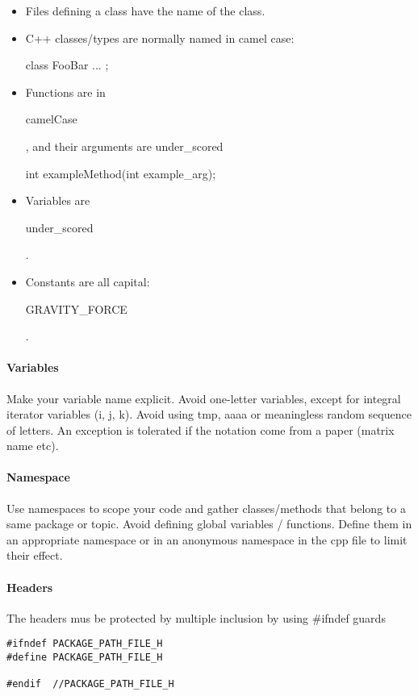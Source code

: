 \begin{itemize}
\item Files defining a class have the name of the class.
\item C++ classes/types are normally named in camel case:\\
\begin{tt}
class FooBar { ... };
\end{tt}
\item Functions are in \begin{tt}camelCase\end{tt}, and their arguments are under\_scored\\
\begin{tt}
int exampleMethod(int example\_arg);
\end{tt}

\item Variables are \begin{tt}under\_scored\end{tt}.

\item Constants are all capital: \begin{tt}GRAVITY\_FORCE\end{tt}.
\end{itemize}

\paragraph{Variables}
Make your variable name explicit.
Avoid one-letter variables, except for integral iterator variables (i, j, k).
Avoid using tmp, aaaa or meaningless random sequence of letters.
An exception is tolerated if the notation come from a paper (matrix name etc). 

\paragraph{Namespace}
Use namespaces to scope your code and gather classes/methods that belong to a same package or topic.
Avoid defining global variables / functions. 
Define them in an appropriate namespace or in an anonymous namespace in the cpp file to limit their effect.

\paragraph{Headers}
The headers mus be protected by multiple inclusion by using \#ifndef guards
\begin{verbatim}
#ifndef PACKAGE_PATH_FILE_H
#define PACKAGE_PATH_FILE_H

#endif  //PACKAGE_PATH_FILE_H
\end{verbatim}

